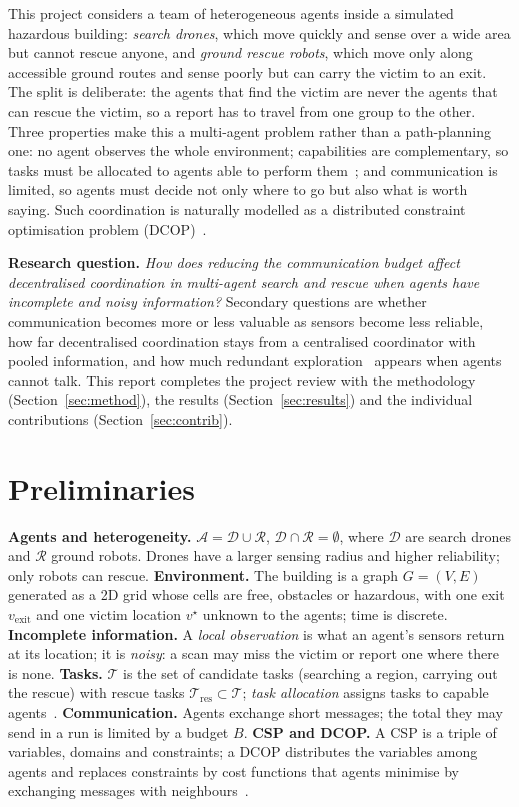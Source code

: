 \documentclass{article}
\newcommand{\A}{\mathscr{A}}
\newcommand{\D}{\mathscr{D}}
\newcommand{\R}{\mathscr{R}}
\newcommand{\T}{\mathscr{T}}
\newcommand{\Tres}{\mathscr{T}_{\mathrm{res}}}
\begin{document}
This project considers a team of heterogeneous agents inside a simulated hazardous building: \emph{search drones}, which
move quickly and sense over a wide area but cannot rescue anyone, and \emph{ground rescue robots}, which move only along
accessible ground routes and sense poorly but can carry the victim to an exit. The split is deliberate: the agents that
find the victim are never the agents that can rescue the victim, so a report has to travel from one group to the other.
Three properties make this a multi-agent problem rather than a path-planning one: no agent observes the whole
environment; capabilities are complementary, so tasks must be allocated to agents able to perform them~\cite{korsah2013};
and communication is limited, so agents must decide not only where to go but also what is worth saying. Such coordination
is naturally modelled as a distributed constraint optimisation problem (DCOP)~\cite{fioretto2018}.

\textbf{Research question.} \emph{How does reducing the communication budget affect decentralised coordination in
multi-agent search and rescue when agents have incomplete and noisy information?} Secondary questions are whether
communication becomes more or less valuable as sensors become less reliable, how far decentralised coordination stays
from a centralised coordinator with pooled information, and how much redundant exploration~\cite{burgard2005} appears when
agents cannot talk. This report completes the project review with the methodology (Section~\ref{sec:method}), the
results (Section~\ref{sec:results}) and the individual contributions (Section~\ref{sec:contrib}).

\section{Preliminaries}
\textbf{Agents and heterogeneity.} $\A=\D\cup\R$, $\D\cap\R=\emptyset$, where $\D$ are search drones and $\R$ ground
robots. Drones have a larger sensing radius and higher reliability; only robots can rescue.
\textbf{Environment.} The building is a graph $G=(V,E)$ generated as a 2D grid whose cells are free, obstacles or
hazardous, with one exit $v_{\mathrm{exit}}$ and one victim location $v^\star$ unknown to the agents; time is discrete.
\textbf{Incomplete information.} A \emph{local observation} is what an agent's sensors return at its location; it is
\emph{noisy}: a scan may miss the victim or report one where there is none.
\textbf{Tasks.} $\T$ is the set of candidate tasks (searching a region, carrying out the rescue) with rescue tasks
$\Tres\subset\T$; \emph{task allocation} assigns tasks to capable agents~\cite{korsah2013}.
\textbf{Communication.} Agents exchange short messages; the total they may send in a run is limited by a budget $B$.
\textbf{CSP and DCOP.} A CSP is a triple of variables, domains and constraints; a DCOP distributes the variables among
agents and replaces constraints by cost functions that agents minimise by exchanging messages with
neighbours~\cite{fioretto2018}.
\end{document}

